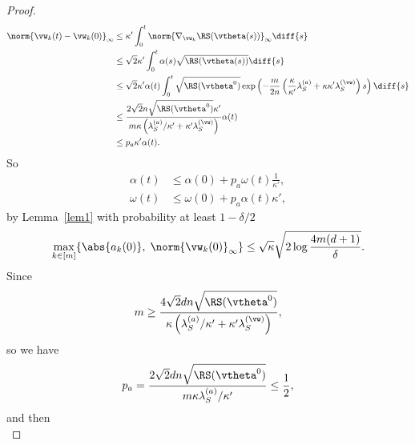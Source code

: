 \documentclass{article}
\begin{document}
\begin{proof}
    \begin{equation}
        \begin{aligned}
            \norm{\vw_k(t) - \vw_k(0)}_{\infty}
             & \leq \kappa'\int_{0}^{t} \norm{\nabla_{\vw_k}\RS(\vtheta(s))}_{\infty}\diff{s}                                                                                                            \\
             & \leq \sqrt{2}\kappa' \int_{0}^t \alpha(s)\sqrt{\RS(\vtheta(s))} \diff{s}                                                                                                                  \\
             & \leq \sqrt{2}\kappa' \alpha(t) \int_{0}^{t} \sqrt{\RS(\vtheta^0)}\exp\left(-\frac{m}{2n}\left(\frac{\kappa}{\kappa'}\lambda_S^{(a)}+\kappa\kappa'\lambda_S^{(\vw)}\right)s\right)\diff{s} \\
             & \leq \frac{2\sqrt{2}n\sqrt{\RS(\vtheta^0)}\kappa'}{m\kappa\left(\lambda^{(a)}_S/\kappa'+\kappa'\lambda_S^{(\vw)}\right)}\alpha(t)                                                         \\
             & \leq p_a\kappa'\alpha(t).
        \end{aligned}
    \end{equation}
    So
    \begin{equation}
        \begin{aligned}
            \alpha(t) & \leq\alpha(0)+p_a\omega(t)\frac{1}{\kappa'}, \\
            \omega(t) & \leq\omega(0)+p_a\alpha(t)\kappa',
        \end{aligned}
    \end{equation}
    by Lemma~\ref{lem1} with probability at least $1 - \delta/2$
    \begin{equation}
        \max\limits_{k\in[m]}\{\abs{a_k(0)},\;\norm{\vw_k(0)}_{\infty}\}\leq\sqrt{\kappa}\sqrt{2\log\frac{4m(d+1)}{\delta}}.
    \end{equation}
    Since
    \begin{equation}
        m \geq \frac{4\sqrt{2}dn\sqrt{\RS(\vtheta^0)}}{\kappa\left(\lambda_S^{(a)}/\kappa'+\kappa'\lambda_S^{(\vw)}\right)},
    \end{equation}
    so we have
    \begin{equation}
        p_a=\frac{2\sqrt{2}dn\sqrt{\RS(\vtheta^0)}}{m\kappa\lambda_S^{(a)}/\kappa'}\leq \frac{1}{2},
    \end{equation}
    and then
    \begin{equation}

\end{equation}
\end{proof}
\end{document}
